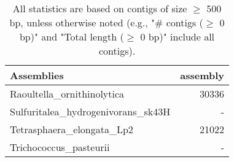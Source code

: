 \documentclass[12pt,a4paper]{article}
\begin{document}
\begin{table}[ht]
\begin{center}
\caption{All statistics are based on contigs of size $\geq$ 500 bp, unless otherwise noted (e.g., "\# contigs ($\geq$ 0 bp)" and "Total length ($\geq$ 0 bp)" include all contigs).}
\begin{tabular}{|l*{1}{|r}|}
\hline
Assemblies & assembly \\ \hline
Raoultella\_ornithinolytica & 30336 \\ \hline
Sulfuritalea\_hydrogenivorans\_sk43H & - \\ \hline
Tetrasphaera\_elongata\_Lp2 & 21022 \\ \hline
Trichococcus\_pasteurii & - \\ \hline
\end{tabular}
\end{center}
\end{table}
\end{document}
